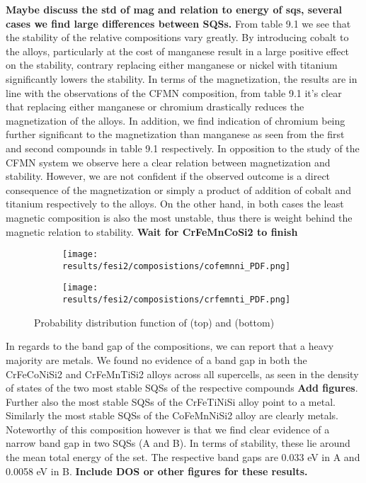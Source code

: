 \textbf{Maybe discuss the std of mag and relation to energy of sqs, several cases we find large differences between SQSs.}
From table 9.1 we see that the stability of the relative compositions vary greatly. By introducing cobalt to the alloys, particularly at the cost of manganese result in a large positive effect on the stability, contrary replacing either manganese or nickel with titanium significantly lowers the stability. In terms of the magnetization, the results are in line with the observations of the CFMN composition, from table 9.1 it's clear that replacing either manganese or chromium drastically reduces the magnetization of the alloys. In addition, we find indication of chromium being further significant to the magnetization than manganese as seen from the first and second compounds in table 9.1 respectively. In opposition to the study of the CFMN system we observe here a clear relation between magnetization and stability. However, we are not confident if the observed outcome is a direct consequence of the magnetization or simply a product of addition of cobalt and titanium respectively to the alloys. On the other hand, in both cases the least magnetic composition is also the most unstable, thus there is weight behind the magnetic relation to stability. \textbf{Wait for CrFeMnCoSi2 to finish}  

\begin{figure}[H]
	\centering
	\begin{subfigure}{\textwidth}
		\texttt{[image: results/fesi2/composistions/cofemnni\_PDF.png]}
	\end{subfigure}
	\begin{subfigure}{\textwidth}
		\texttt{[image: results/fesi2/composistions/crfemnti\_PDF.png]}
	\end{subfigure}
	\caption{Probability distribution function of  (top) and  (bottom)}
\end{figure}

In regards to the band gap of the compositions, we can report that a heavy majority are metals. We found no evidence of a band gap in both the CrFeCoNiSi2 and CrFeMnTiSi2 alloys across all supercells, as seen in the density of states of the two most stable SQSs of the respective compounds \textbf{Add figures}. Further also the most stable SQSs of the CrFeTiNiSi alloy point to a metal. Similarly the most stable SQSs of the CoFeMnNiSi2 alloy are clearly metals. Noteworthy of this composition however is that we find clear evidence of a narrow band gap in two SQSs (A and B). In terms of stability, these lie around the mean total energy of the set. The respective band gaps are 0.033 eV in A and 0.0058 eV in B. \textbf{Include DOS or other figures for these results.} 

